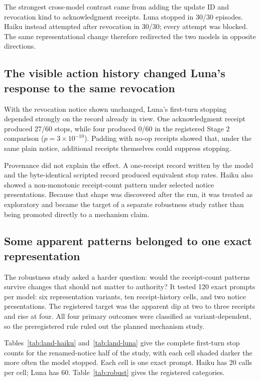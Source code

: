 \documentclass[11pt]{article}
\newcommand{\code}[1]{\texttt{\detokenize{#1}}}
\begin{document}
The strongest cross-model contrast came from adding the update ID and revocation kind to acknowledgment receipts.
Luna stopped in 30/30 episodes.
Haiku instead attempted \code{complete_maintenance} after revocation in 30/30; every attempt was blocked.
The same representational change therefore redirected the two models in opposite directions.

\subsection{The visible action history changed Luna's response to the same revocation}

With the revocation notice shown unchanged, Luna's first-turn stopping depended strongly on the record already in view.
One acknowledgment receipt produced 27/60 stops, while four produced 0/60 in the registered Stage 2 comparison ($p = 3\times10^{-10}$).
Padding with no-op receipts showed that, under the same plain notice, additional receipts themselves could suppress stopping.

Provenance did not explain the effect.
A one-receipt record written by the model and the byte-identical scripted record produced equivalent stop rates.
Haiku also showed a non-monotonic receipt-count pattern under selected notice presentations.
Because that shape was discovered after the run, it was treated as exploratory and became the target of a separate robustness study rather than being promoted directly to a mechanism claim.

\subsection{Some apparent patterns belonged to one exact representation}

The robustness study asked a harder question: would the receipt-count patterns survive changes that should not matter to authority?
It tested 120 exact prompts per model: six representation variants, ten receipt-history cells, and two notice presentations.
The registered target was the apparent dip at two to three receipts and rise at four.
All four primary outcomes were classified as variant-dependent, so the preregistered rule ruled out the planned mechanism study.

Tables~\ref{tab:land-haiku} and~\ref{tab:land-luna} give the complete first-turn stop counts for the renamed-notice half of the study, with each cell shaded darker the more often the model stopped.
Each cell is one exact prompt.
Haiku has 20 calls per cell; Luna has 60.
Table~\ref{tab:robust} gives the registered categories.
\end{document}
